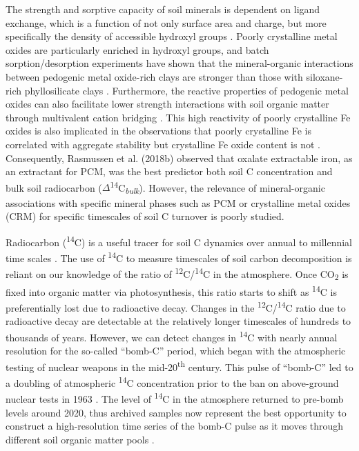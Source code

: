 \documentclass[soil, manuscript]{copernicus}
\begin{document}
The strength and sorptive capacity of soil minerals is dependent on
ligand exchange, which is a function of not only surface area and
charge, but more specifically the density of accessible hydroxyl groups
\citep{kaiser2003, rasmussen2018a, kleber2015}. Poorly crystalline metal
oxides are particularly enriched in hydroxyl groups, and batch
sorption/desorption experiments have shown that the mineral-organic
interactions between pedogenic metal oxide-rich clays are stronger than
those with siloxane-rich phyllosilicate clays \citep{kahle2004}.
Furthermore, the reactive properties of pedogenic metal oxides can also
facilitate lower strength interactions with soil organic matter through
multivalent cation bridging \citep{kleber2007}. This high reactivity of
poorly crystalline Fe oxides is also implicated in the observations that
poorly crystalline Fe is correlated with aggregate stability but
crystalline Fe oxide content is not \citep{duiker2003}. Consequently,
Rasmussen et al. (2018b) observed that oxalate extractable iron, as an
extractant for PCM, was the best predictor both soil C concentration and
bulk soil radiocarbon
(\(\Delta\)\textsuperscript{14}C\textsubscript{\emph{bulk}}). However,
the relevance of mineral-organic associations with specific mineral
phases such as PCM or crystalline metal oxides (CRM) for specific
timescales of soil C turnover is poorly studied.

Radiocarbon (\textsuperscript{14}C) is a useful tracer for soil C
dynamics over annual to millennial time scales \citep{trumbore2000}. The
use of \textsuperscript{14}C to measure timescales of soil carbon
decomposition is reliant on our knowledge of the ratio of
\textsuperscript{12}C/\textsuperscript{14}C in the atmosphere. Once
CO\textsubscript{2} is fixed into organic matter via photosynthesis,
this ratio starts to shift as \textsuperscript{14}C is preferentially
lost due to radioactive decay. Changes in the
\textsuperscript{12}C/\textsuperscript{14}C ratio due to radioactive
decay are detectable at the relatively longer timescales of hundreds to
thousands of years. However, we can detect changes in
\textsuperscript{14}C with nearly annual resolution for the so-called
``bomb-C'' period, which began with the atmospheric testing of nuclear
weapons in the mid-20\textsuperscript{th} century. This pulse of
``bomb-C'' led to a doubling of atmospheric \textsuperscript{14}C
concentration prior to the ban on above-ground nuclear tests in 1963
\citep{hua2021}. The level of \textsuperscript{14}C in the atmosphere
returned to pre-bomb levels around 2020, thus archived samples now
represent the best opportunity to construct a high-resolution time
series of the bomb-C pulse as it moves through different soil organic
matter pools \citep{trumbore2009}.
\end{document}
